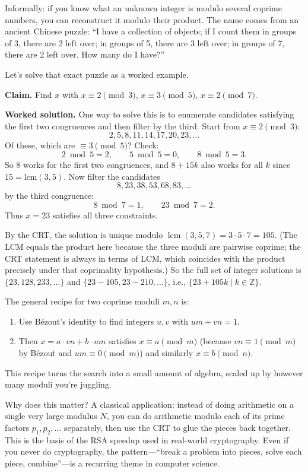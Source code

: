 \documentclass[11pt]{article}
\begin{document}
Informally: if you know what an unknown integer is modulo several coprime numbers, you can reconstruct it modulo their product. The name comes from an ancient Chinese puzzle: ``I have a collection of objects; if I count them in groups of 3, there are 2 left over; in groups of 5, there are 3 left over; in groups of 7, there are 2 left over. How many do I have?''

Let's solve that exact puzzle as a worked example.

\textbf{Claim.} Find $x$ with $x \equiv 2 \pmod 3$, $x \equiv 3 \pmod 5$, $x \equiv 2 \pmod 7$.

\textbf{Worked solution.} One way to solve this is to enumerate
candidates satisfying the first two congruences and then filter by the
third. Start from $x \equiv 2 \pmod 3$:
\[
  2, 5, 8, 11, 14, 17, 20, 23, \ldots
\]
Of these, which are $\equiv 3 \pmod 5$? Check:
\[
  2 \bmod 5 = 2,\qquad
  5 \bmod 5 = 0,\qquad
  8 \bmod 5 = 3.
\]
So $8$ works for the first two congruences, and $8 + 15k$ also works
for all $k$ since $15 = \text{lcm}(3, 5)$. Now filter the candidates
\[
  8, 23, 38, 53, 68, 83, \ldots
\]
by the third congruence:
\[
  8 \bmod 7 = 1,\qquad 23 \bmod 7 = 2.
\]
Thus $x = 23$ satisfies all three constraints.

By the CRT, the solution is unique modulo $\operatorname{lcm}(3, 5, 7) = 3 \cdot 5 \cdot 7 = 105$. (The LCM equals the product here because the three moduli are pairwise coprime; the CRT statement is always in terms of LCM, which coincides with the product precisely under that coprimality hypothesis.) So the full set of integer solutions is $\{23, 128, 233, \ldots\}$ and $\{23 - 105, 23 - 210, \ldots\}$, i.e., $\{23 + 105k \mid k \in \mathbb{Z}\}$.

The general recipe for two coprime moduli $m, n$ is:
\begin{enumerate}
  \item Use B\'ezout's identity to find integers $u, v$ with $um + vn = 1$.
  \item Then $x = a \cdot vn + b \cdot um$ satisfies $x \equiv a \pmod m$ (because $vn \equiv 1 \pmod m$ by B\'ezout and $um \equiv 0 \pmod m$) and similarly $x \equiv b \pmod n$. \checkmark
\end{enumerate}
This recipe turns the search into a small amount of algebra, scaled up by however many moduli you're juggling.

Why does this matter? A classical application: instead of doing arithmetic on a single very large modulus $N$, you can do arithmetic modulo each of its prime factors $p_1, p_2, \ldots$ separately, then use the CRT to glue the pieces back together. This is the basis of the RSA speedup used in real-world cryptography. Even if you never do cryptography, the pattern---``break a problem into pieces, solve each piece, combine''---is a recurring theme in computer science.
\end{document}
